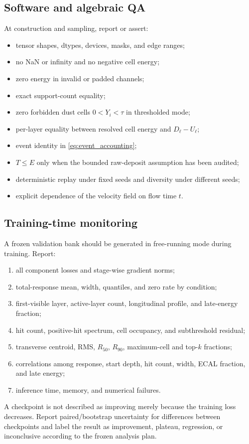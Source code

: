 \documentclass[11pt]{article}
\theoremstyle{definition}
\theoremstyle{remark}
\begin{document}
\subsection{Software and algebraic QA}
At construction and sampling, report or assert:
\begin{itemize}[leftmargin=2em]
  \item tensor shapes, dtypes, devices, masks, and edge ranges;
  \item no NaN or infinity and no negative cell energy;
  \item zero energy in invalid or padded channels;
  \item exact support-count equality;
  \item zero forbidden dust cells $0<Y_i<\tau$ in thresholded mode;
  \item per-layer equality between resolved cell energy and $D_\ell-U_\ell$;
  \item event identity in \cref{eq:event_accounting};
  \item $T\le E$ only when the bounded raw-deposit assumption has been audited;
  \item deterministic replay under fixed seeds and diversity under different seeds;
  \item explicit dependence of the velocity field on flow time $t$.
\end{itemize}

\subsection{Training-time monitoring}
A frozen validation bank should be generated in free-running mode during training. Report:
\begin{enumerate}[leftmargin=2em]
  \item all component losses and stage-wise gradient norms;
  \item total-response mean, width, quantiles, and zero rate by condition;
  \item first-visible layer, active-layer count, longitudinal profile, and late-energy fraction;
  \item hit count, positive-hit spectrum, cell occupancy, and subthreshold residual;
  \item transverse centroid, RMS, $R_{50}$, $R_{90}$, maximum-cell and top-$k$ fractions;
  \item correlations among response, start depth, hit count, width, ECAL fraction, and late energy;
  \item inference time, memory, and numerical failures.
\end{enumerate}
A checkpoint is not described as improving merely because the training loss decreases. Report paired/bootstrap uncertainty for differences between checkpoints and label the result as improvement, plateau, regression, or inconclusive according to the frozen analysis plan.
\end{document}
